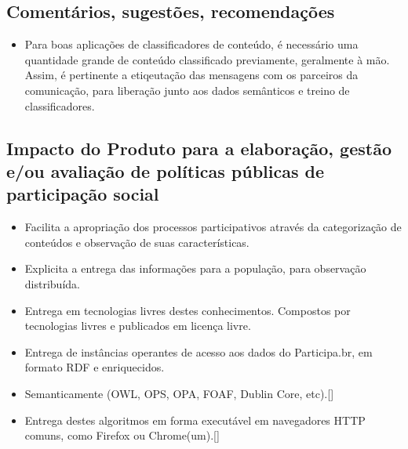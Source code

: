 \documentclass[12pt]{article}
\begin{document}
\subsection{Comentários, sugestões, recomendações}
\begin{itemize}
    \item Para boas aplicações de classificadores de conteúdo, é necessário uma quantidade grande de conteúdo classificado previamente, geralmente à mão. Assim, é pertinente a etiqeutação das mensagens com os parceiros da comunicação, para liberação junto aos dados semânticos e treino de classificadores.
\end{itemize}
\subsection{Impacto do Produto para a elaboração, gestão e/ou avaliação de políticas públicas de participação social}
\begin{itemize}
    \item Facilita a apropriação dos processos participativos através da categorização de conteúdos e observação de suas características. 
    \item Explicita a entrega das informações para a população, para observação distribuída.
    \item Entrega em tecnologias livres destes conhecimentos. Compostos por tecnologias livres e publicados em licença livre.
    \item Entrega de instâncias operantes de acesso aos dados do Participa.br, em formato RDF e enriquecidos.
    \item Semanticamente (OWL, OPS, OPA, FOAF, Dublin Core, etc).[]
    \item Entrega destes algoritmos em forma executável em navegadores HTTP comuns, como Firefox ou Chrome(um).[]
\end{itemize}
\end{document}
